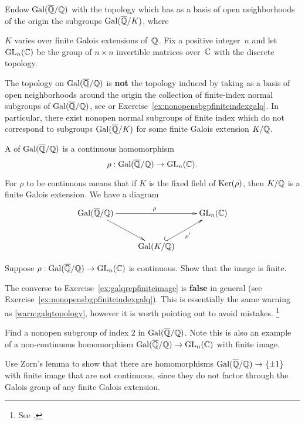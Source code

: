 Endow $\operatorname{Gal}(\overline{\mathbb{Q}}/\mathbb{Q})$ with the topology which has as a basis of open neighborhoods
of the origin the subgroups $\operatorname{Gal}(\overline{\mathbb{Q}}/K)$, where~{$K$ varies
over finite Galois extensions of~$\mathbb{Q}$.
Fix a positive integer~$n$ and let $\operatorname{GL}_n(\mathbb{C})$ be the group of
$n\times n$ invertible matrices over~$\mathbb{C}$ with the discrete topology.

\begin{warning}\label{warn:galqtopology}
	The topology on $\operatorname{Gal}(\overline{\mathbb{Q}}/\mathbb{Q})$ is {\bf not} the topology induced
	by taking as a basis of open neighborhoods around the origin
	the collection of finite-index normal subgroups of $\operatorname{Gal}(\overline{\mathbb{Q}}/\mathbb{Q})$,
	see \cite[Chapter 7]{milne:FT} or
	Exercise~\ref{ex:nonopensbgpfiniteindexgalq}. In particular,
	there exist nonopen normal subgroups of finite index which
	do not correspond to subgroups $\operatorname{Gal}(\overline{\mathbb{Q}}/K)$ for some
	finite Galois extension $K/\mathbb{Q}$.
\end{warning}

\begin{definition}
A  of $\operatorname{Gal}(\overline{\mathbb{Q}}/\mathbb{Q})$
is a continuous homomorphism
$$
  \rho:\operatorname{Gal}(\overline{\mathbb{Q}}/\mathbb{Q})\to \operatorname{GL}_n(\mathbb{C}).
$$
\end{definition}
For $\rho$ to be continuous means that if $K$ is the fixed
field of $\operatorname{Ker}(\rho)$, then $K/\mathbb{Q}$ is a finite Galois extension.  We have
a diagram
$$\xymatrix{ {\galq}\ar[rr]^{\rho}\ar[dr]& &{\GL_n(\C)}\\
&{\Gal(K/\Q)}\ar@{^{(}->}[ur]_{\rho'}}
$$

\begin{exercise}\label{ex:galqrepfiniteimage}
	Suppose $\rho:\operatorname{Gal}(\overline{\mathbb{Q}}/\mathbb{Q})\to\operatorname{GL}_n(\mathbb{C})$ is continuous.
	Show that the image is finite.
\end{exercise}

\begin{remark}
	The converse to Exercise~\ref{ex:galqrepfiniteimage}
	is \textbf{false} in general (see
	Exercise~\ref{ex:nonopensbgpfiniteindexgalq}).
	This is essentially the same warning as
	\ref{warn:galqtopology}, however it is worth
	pointing out to avoid mistakes.
	\footnote{See \cite[p. 1]{artinconjectureLectureNotes}.}
\end{remark}

\begin{exercise}\label{ex:nonopensbgpfiniteindexgalq}
	Find a nonopen subgroup of index $2$ in $\operatorname{Gal}(\overline{\mathbb{Q}}/\mathbb{Q})$.
	Note this is also an example of a non-continuous
	homomorphism $\operatorname{Gal}(\overline{\mathbb{Q}}/\mathbb{Q})\to\operatorname{GL}_n(\mathbb{C})$ with finite image.
	
	
	\begin{hint}
		Use Zorn's lemma to show that there are homomorphisms
		$\operatorname{Gal}(\overline{\mathbb{Q}}/\mathbb{Q})\to\{\pm 1\}$ with finite image that are not continuous,
		since they do not factor through the Galois group of any
		finite Galois extension.
	\end{hint}
	

\end{exercise}}

